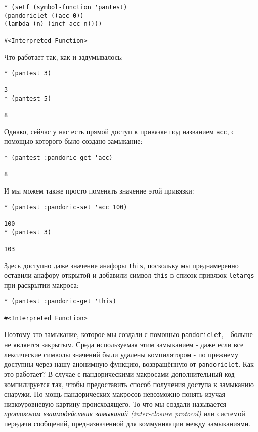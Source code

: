 \begin{verbatim}
* (setf (symbol-function 'pantest)
(pandoriclet ((acc 0))
(lambda (n) (incf acc n))))

#<Interpreted Function>
\end{verbatim}

Что работает так, как и задумывалось:

\begin{verbatim}
* (pantest 3)

3
* (pantest 5)

8
\end{verbatim}

Однако, сейчас у нас есть прямой доступ к привязке под названием \verb"acc", с помощью которого было создано замыкание:

\begin{verbatim}
* (pantest :pandoric-get 'acc)

8
\end{verbatim}

И мы можем также просто поменять значение этой привязки:

\begin{verbatim}
* (pantest :pandoric-set 'acc 100)

100
* (pantest 3)

103
\end{verbatim}

Здесь доступно даже значение анафоры \verb"this", поскольку мы преднамеренно оставили анафору открытой и добавили символ \verb"this" в список привязок \verb"letargs" при раскрытии макроса:

\begin{verbatim}
* (pantest :pandoric-get 'this)

#<Interpreted Function>
\end{verbatim}

Поэтому это замыкание, которое мы создали с помощью \verb"pandoriclet", - больше не является закрытым. Среда используемая этим замыканием - даже если все лексические символы значений были удалены компилятором - по прежнему доступны через нашу анонимную функцию, возвращённую от \verb"pandoriclet". Как это работает? В случае с пандорическими макросами дополнительный код компилируется так, чтобы предоставить способ получения доступа к замыканию снаружи. Но мощь пандорических макросов невозможно понять изучая низкоуровневую картину происходящего. То что мы создали называется \emph{протоколом взаимодействия замыканий (inter-closure protocol)} или системой передачи сообщений, предназначенной для коммуникации между замыканиями.

